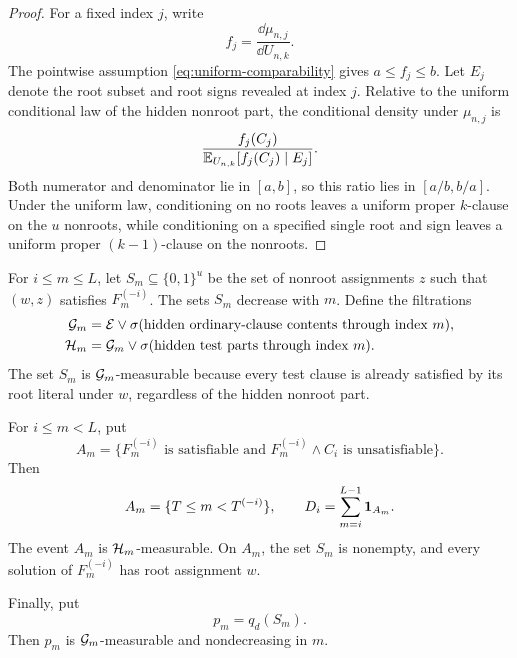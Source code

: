 \begin{proof}
For a fixed index $j$, write
\[
    f_j=\frac{\dd\mu_{n,j}}{\dd U_{n,k}}.
\]
The pointwise assumption \eqref{eq:uniform-comparability} gives
$a\le f_j\le b$.  Let $E_j$ denote the root subset and root signs revealed
at index $j$.  Relative to the uniform conditional law of the hidden
nonroot part, the conditional density under $\mu_{n,j}$ is
\[
    \frac{f_j(C_j)}{
      \mathbb E_{U_{n,k}}[f_j(C_j)\mid E_j]}.
\]
Both numerator and denominator lie in $[a,b]$, so this ratio lies in
$[a/b,b/a]$.  Under the uniform law, conditioning on no roots leaves a
uniform proper $k$-clause on the $u$ nonroots, while conditioning on a
specified single root and sign leaves a uniform proper $(k-1)$-clause on
the nonroots.
\end{proof}

For $i\le m\le L$, let $S_m\subseteq\{0,1\}^u$ be the set of nonroot
assignments $z$ such that $(w,z)$ satisfies $F_m^{(-i)}$.  The sets $S_m$
decrease with $m$.  Define the filtrations
\begin{align*}
    \mathcal G_m
    &=\mathcal E\vee
      \sigma(\text{hidden ordinary-clause contents through index }m),\\
    \mathcal H_m
    &=\mathcal G_m\vee
      \sigma(\text{hidden test parts through index }m).
\end{align*}
The set $S_m$ is $\mathcal G_m$-measurable because every test clause is already
satisfied by its root literal under $w$, regardless of the hidden nonroot
part.

For $i\le m<L$, put
\begin{equation}
    A_m=
    \{F_m^{(-i)}\text{ is satisfiable and }
      F_m^{(-i)}\wedge C_i\text{ is unsatisfiable}\}.
    \label{eq:A-definition}
\end{equation}
Then
\begin{equation}
    A_m=\{T\le m<T^{(-i)}\},
    \qquad
    D_i=\sum_{m=i}^{L-1}\mathbf 1_{A_m}.
    \label{eq:delay-count}
\end{equation}
The event $A_m$ is $\mathcal H_m$-measurable.  On $A_m$, the set $S_m$ is
nonempty, and every solution of $F_m^{(-i)}$ has root assignment $w$.

Finally, put
\begin{equation}
    p_m=q_d(S_m).
    \label{eq:p-definition}
\end{equation}
Then $p_m$ is $\mathcal G_m$-measurable and nondecreasing in $m$.
